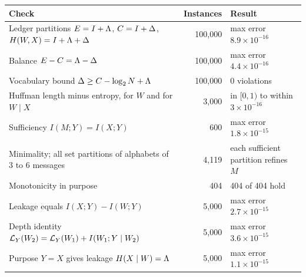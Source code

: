 \begin{tabular}{@{}p{7.9cm} r p{3.6cm}@{}}
\toprule
Check & Instances & Result \\
\midrule
Ledger partitions $E=I+\Lambda$, $C=I+\Delta$, $H(W,X)=I+\Lambda+\Delta$ & 100{,}000 & max error $8.9\times10^{-16}$ \\
Balance $E-C=\Lambda-\Delta$ & 100{,}000 & max error $4.4\times10^{-16}$ \\
Vocabulary bound $\Delta\ge C-\log_2 N+\Lambda$ & 100{,}000 & 0 violations \\
Huffman length minus entropy, for $W$ and for $W\mid X$ & 3{,}000 & in $[0,1)$ to within $3\times10^{-16}$ \\
Sufficiency $I(M;Y)=I(X;Y)$ & 600 & max error $1.8\times10^{-15}$ \\
Minimality; all set partitions of alphabets of 3 to 6 messages & 4{,}119 & each sufficient partition refines $M$ \\
Monotonicity in purpose & 404 & 404 of 404 hold \\
Leakage equals $I(X;Y)-I(W;Y)$ & 5{,}000 & max error $2.7\times10^{-15}$ \\
Depth identity $\mathcal{L}_Y(W_2)=\mathcal{L}_Y(W_1)+I(W_1;Y\mid W_2)$ & 5{,}000 & max error $3.6\times10^{-15}$ \\
Purpose $Y=X$ gives leakage $H(X\mid W)=\Lambda$ & 5{,}000 & max error $1.1\times10^{-15}$ \\
\bottomrule
\end{tabular}